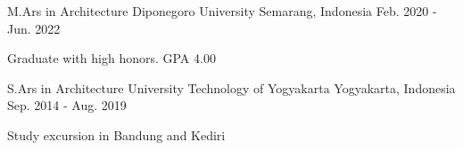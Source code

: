 

\begin{cventries}

	\cventry
	{M.Ars in Architecture} %
	{Diponegoro University} %
	{Semarang, Indonesia} %
	{Feb. 2020 - Jun. 2022} %
	{
		\begin{cvitems} %
			\item {Graduate with high honors. GPA 4.00 }
		\end{cvitems}
	}
	\cventry
	{S.Ars in Architecture} %
	{University Technology of Yogyakarta} %
	{Yogyakarta, Indonesia} %
	{Sep. 2014 - Aug. 2019} %
	{
		\begin{cvitems} %
			\item {Study excursion in Bandung and Kediri}
		\end{cvitems}
	}
\end{cventries}
